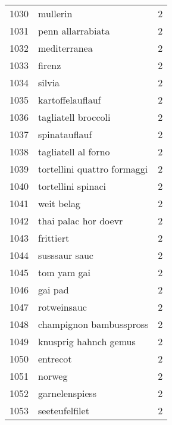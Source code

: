 \begin{tabular}{llr}
1030 &                                           mullerin &      2 \\
1031 &                                  penn allarrabiata &      2 \\
1032 &                                       mediterranea &      2 \\
1033 &                                             firenz &      2 \\
1034 &                                             silvia &      2 \\
1035 &                                   kartoffelauflauf &      2 \\
1036 &                                tagliatell broccoli &      2 \\
1037 &                                      spinatauflauf &      2 \\
1038 &                                tagliatell al forno &      2 \\
1039 &                        tortellini quattro formaggi &      2 \\
1040 &                                 tortellini spinaci &      2 \\
1041 &                                         weit belag &      2 \\
1042 &                               thai palac hor doevr &      2 \\
1043 &                                          frittiert &      2 \\
1044 &                                      susssaur sauc &      2 \\
1045 &                                        tom yam gai &      2 \\
1046 &                                            gai pad &      2 \\
1047 &                                        rotweinsauc &      2 \\
1048 &                            champignon bambusspross &      2 \\
1049 &                              knusprig hahnch gemus &      2 \\
1050 &                                           entrecot &      2 \\
1051 &                                             norweg &      2 \\
1052 &                                     garnelenspiess &      2 \\
1053 &                                     seeteufelfilet &      2 \\

\end{tabular}

